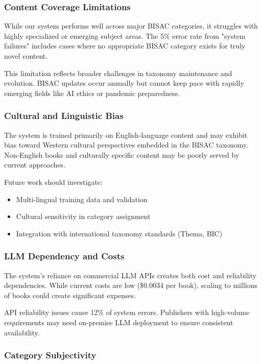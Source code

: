 \documentclass{article}
\begin{document}
\subsubsection{Content Coverage Limitations}

While our system performs well across major BISAC categories, it struggles with highly specialized or emerging subject areas. The 5\% error rate from "system failures" includes cases where no appropriate BISAC category exists for truly novel content.

This limitation reflects broader challenges in taxonomy maintenance and evolution. BISAC updates occur annually but cannot keep pace with rapidly emerging fields like AI ethics or pandemic preparedness.

\subsubsection{Cultural and Linguistic Bias}

The system is trained primarily on English-language content and may exhibit bias toward Western cultural perspectives embedded in the BISAC taxonomy. Non-English books and culturally specific content may be poorly served by current approaches.

Future work should investigate:
\begin{itemize}
\item Multi-lingual training data and validation
\item Cultural sensitivity in category assignment
\item Integration with international taxonomy standards (Thema, BIC)
\end{itemize}

\subsubsection{LLM Dependency and Costs}

The system's reliance on commercial LLM APIs creates both cost and reliability dependencies. While current costs are low (\$0.0034 per book), scaling to millions of books could create significant expenses.

API reliability issues cause 12\% of system errors. Publishers with high-volume requirements may need on-premise LLM deployment to ensure consistent availability.

\subsubsection{Category Subjectivity}
\end{document}
